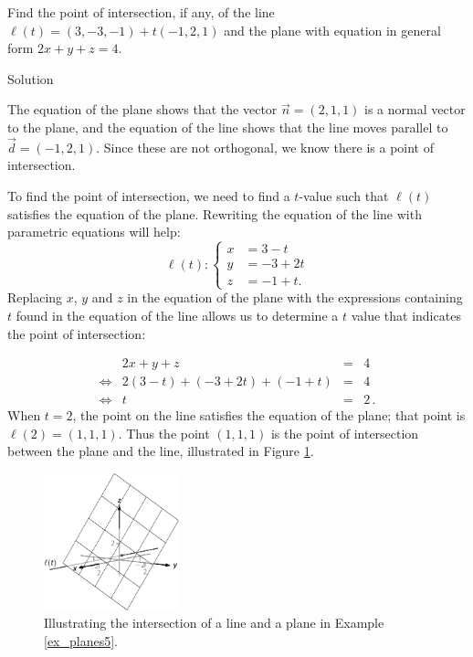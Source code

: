 \ifanalysis
\begin{example}\label{ex_planes5}
Find the point of intersection, if any, of the line $\ell(t) = ( 3,-3,-1) +t(-1,2,1)$ and the plane with equation in general form $2x+y+z=4$.

Solution 


The equation of the plane shows that the vector $\vec n = ( 2,1,1)$ is a normal vector to the plane, and the equation of the line shows that the line moves parallel to $\vec d = ( -1,2,1)$. Since these are not orthogonal, we know there is a point of intersection. 

To find the point of intersection, we need to find a $t$-value such that $\ell(t)$ satisfies the equation of the plane. Rewriting the equation of the line with parametric equations will help:
$$\ell(t) : \left\{\begin{aligned} x&= 3-t\\ y&=-3+2t\\ z&= -1+t. \end{aligned}\right.$$
Replacing $x$, $y$ and $z$ in the equation of the plane with the expressions containing $t$ found in the equation of the line allows us to determine a $t$ value that indicates the point of intersection:

$$
\begin{array}{rrcl}
&2x+y+z &=& 4 \\
\Leftrightarrow&2(3-t) + (-3+2t) + (-1+t) &=& 4\\
\Leftrightarrow&t&=&2\,.
\end{array}
$$
When $t=2$, the point on the line satisfies the equation of the plane; that point is $\ell(2) = ( 1,1,1)$. Thus the point $(1,1,1)$ is the point of intersection between the plane and the line, illustrated in Figure \ref{fig_ana_geo_8}.


\begin{figure}[H]
	\begin{center}
			\includegraphics[width=0.35\textwidth]{fig_ana_geo_8}
	\caption{Illustrating the intersection of a line and a plane in Example \ref{ex_planes5}.}
	\label{fig_ana_geo_8}
	\end{center}
\end{figure}

\end{example}
\fi

